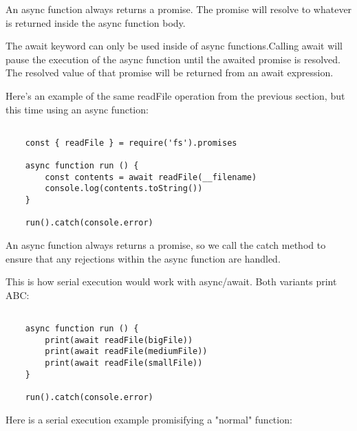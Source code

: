 \documentclass{scrartcl}
\begin{document}
An async function always returns a promise. The promise will resolve to whatever is returned inside the async function body.

The await keyword can only be used inside of async functions.Calling await will pause the execution of the async function until the awaited promise is resolved. The resolved value of that promise will be returned from an await expression.

Here's an example of the same readFile operation from the previous section, but this time using an async function:

\begin{lstlisting}[style=ES6]

    const { readFile } = require('fs').promises

    async function run () {
        const contents = await readFile(__filename)
        console.log(contents.toString())
    }

    run().catch(console.error)

\end{lstlisting}

An async function always returns a promise, so we call the catch method to ensure that any rejections within the async function are handled.

This is how serial execution would work with async/await. Both variants print ABC:

\begin{lstlisting}[style=ES6]

    async function run () {
        print(await readFile(bigFile))
        print(await readFile(mediumFile))
        print(await readFile(smallFile))
    }

    run().catch(console.error)

\end{lstlisting}

Here is a serial execution example promisifying a "normal" function:
\end{document}
